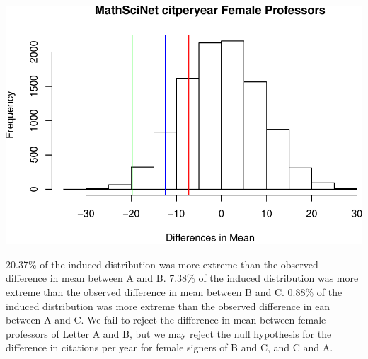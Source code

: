 \documentclass[]{article}
\newenvironment{Shaded}{\begin{snugshade}}{\end{snugshade}}
\newcommand{\DataTypeTok}[1]{\textcolor[rgb]{0.13,0.29,0.53}{#1}}
\newcommand{\DecValTok}[1]{\textcolor[rgb]{0.00,0.00,0.81}{#1}}
\newcommand{\KeywordTok}[1]{\textcolor[rgb]{0.13,0.29,0.53}{\textbf{#1}}}
\newcommand{\NormalTok}[1]{#1}
\newcommand{\OperatorTok}[1]{\textcolor[rgb]{0.81,0.36,0.00}{\textbf{#1}}}
\newcommand{\StringTok}[1]{\textcolor[rgb]{0.31,0.60,0.02}{#1}}
\begin{document}
\begin{Shaded}
\end{Shaded}

\includegraphics{final_files/figure-latex/unnamed-chunk-43-1.pdf}

20.37\% of the induced distribution was more extreme than the observed
difference in mean between A and B. 7.38\% of the induced distribution
was more extreme than the observed difference in mean between B and C.
0.88\% of the induced distribution was more extreme than the observed
difference in ean between A and C. We fail to reject the difference in
mean between female professors of Letter A and B, but we may reject the
null hypothesis for the difference in citations per year for female
signers of B and C, and C and A.
\end{document}
